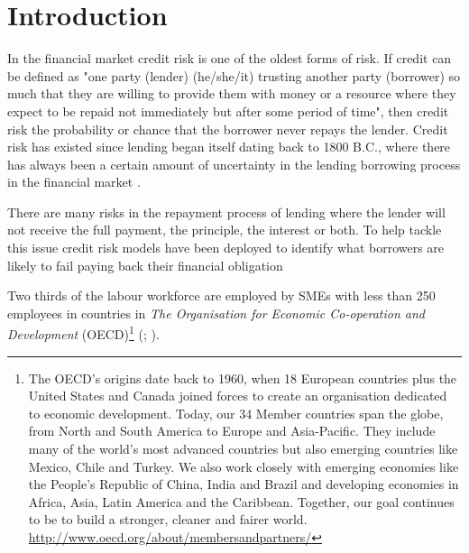 
\chapter{Introduction} %

\label{Chapter1} %


In the financial market credit risk is one of the oldest forms of risk. If credit can be defined as "one party (lender) (he/she/it) trusting another party (borrower) so much that they are willing to provide them with money or a resource where they expect to be repaid not immediately but after some period of time", then credit risk the probability or chance that the borrower never repays the lender. Credit risk has existed since lending began itself dating back to 1800 B.C., where there has always been a certain amount of uncertainty in the lending borrowing process in the financial market \citep{caouette_managing_1998}.

There are many risks in the repayment process of lending where the lender will not receive the full payment, the principle, the interest or both. To help tackle this issue credit risk models have been deployed to identify what borrowers are likely to fail paying back their financial obligation \citep{sirirattanaphonkun_default_2012}

Two thirds of the labour workforce are employed by SMEs with less than 250 employees in countries in \textit{The Organisation for Economic Co-operation and Development} (OECD)\footnote{The OECD's origins date back to 1960, when 18 European countries plus the United States and Canada joined forces to create an organisation dedicated to economic development. Today, our 34 Member countries span the globe, from North and South America to Europe and Asia-Pacific. They include many of the world’s most advanced countries but also emerging countries like Mexico, Chile and Turkey. We also work closely with emerging economies like the People's Republic of China, India and Brazil and developing economies in Africa, Asia, Latin America and the Caribbean. Together, our goal continues to be to build a stronger, cleaner and fairer world. \url{http://www.oecd.org/about/membersandpartners/}} (\cite{beck_bank_2008}; \cite{dietrich_explaining_2012}).

